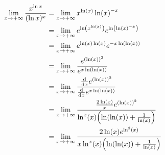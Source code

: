 \documentclass[]{article}
\begin{document}
\begin{align*}
    \lim_{x \to +\infty} \frac{x^{\ln{x}}}{(\ln{x})^x}
    &= \lim_{x \to + \infty}
        x^{\ln(x)} \ln(x)^{-x}\\
    &= \lim_{x \to + \infty}
        e^{\ln(x^{\ln(x)})} e^{\ln(\ln(x)^{-x})}\\
    &= \lim_{x \to + \infty}
        e^{\ln(x) \ln(x)} e^{- x \ln(\ln(x))}\\
    &= \lim_{x \to + \infty}
        \frac{
            e^{(\ln(x))^2}
        }{
            e^{x \ln(\ln(x))}
        }\\
    &= \lim_{x \to + \infty}
        \frac{
            \dv{x} e^{(\ln(x))^2}
        }{
            \dv{x} e^{x \ln(\ln(x))}
        }\\
    &= \lim_{x \to + \infty}
        \frac{
            \frac{2 \ln(x)}{x} e^{(\ln(x))^2}
        }{
            \ln^x(x) \qty(\ln(\ln(x))+ \frac{1}{\ln(x)})
        }\\
    &= \lim_{x \to + \infty}
        \frac{
            2 \ln(x) e^{\ln^2(x)}
        }{
            x \ln^x(x) \qty(\ln(\ln(x))+ \frac{1}{\ln(x)})
        }\\

\end{align*}
\end{document}
